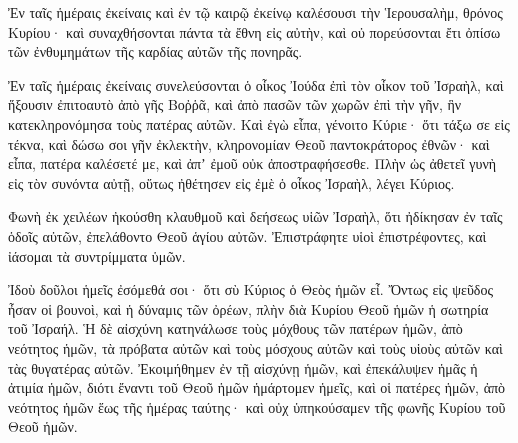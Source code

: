 {Ἐν ταῖς ἡμέραις ἐκείναις καὶ ἐν τῷ καιρῷ ἐκείνῳ καλέσουσι τὴν Ἱερουσαλὴμ, θρόνος Κυρίου· καὶ συναχθήσονται πάντα τὰ ἔθνη εἰς αὐτὴν, καὶ οὐ πορεύσονται ἔτι ὀπίσω τῶν ἐνθυμημάτων τῆς καρδίας αὐτῶν τῆς πονηρᾶς.
\par }{\PP {}Ἐν ταῖς ἡμέραις ἐκείναις συνελεύσονται ὁ οἶκος Ἰούδα ἐπὶ τὸν οἶκον τοῦ Ἰσραὴλ, καὶ ἥξουσιν ἐπιτοαυτὸ ἀπὸ γῆς Βοῤῥᾶ, καὶ ἀπὸ πασῶν τῶν χωρῶν ἐπὶ τὴν γῆν, ἣν κατεκληρονόμησα τοὺς πατέρας αὐτῶν.
Καὶ ἐγὼ εἶπα, γένοιτο Κύριε· ὅτι τάξω σε εἰς τέκνα, καὶ δώσω σοι γῆν ἐκλεκτὴν, κληρονομίαν Θεοῦ παντοκράτορος ἐθνῶν· καὶ εἶπα, πατέρα καλέσετέ με, καὶ ἀπʼ ἐμοῦ οὐκ ἀποστραφήσεσθε.
Πλὴν ὡς ἀθετεῖ γυνὴ εἰς τὸν συνόντα αὐτῇ, οὕτως ἠθέτησεν εἰς ἐμὲ ὁ οἶκος Ἰσραὴλ, λέγει Κύριος.
\par }{\PP {}Φωνὴ ἐκ χειλέων ἠκούσθη κλαυθμοῦ καὶ δεήσεως υἱῶν Ἰσραὴλ, ὅτι ἠδίκησαν ἐν ταῖς ὁδοῖς αὐτῶν, ἐπελάθοντο Θεοῦ ἁγίου αὐτῶν.
Ἐπιστράφητε υἱοὶ ἐπιστρέφοντες, καὶ ἰάσομαι τὰ συντρίμματα ὑμῶν.
\par }{\PP Ἰδοὺ δοῦλοι ἡμεῖς ἐσόμεθά σοι· ὅτι σὺ Κύριος ὁ Θεὸς ἡμῶν εἶ.
Ὄντως εἰς ψεῦδος ἦσαν οἱ βουνοὶ, καὶ ἡ δύναμις τῶν ὀρέων, πλὴν διὰ Κυρίου Θεοῦ ἡμῶν ἡ σωτηρία τοῦ Ἰσραήλ.
Ἡ δὲ αἰσχύνη κατηνάλωσε τοὺς μόχθους τῶν πατέρων ἡμῶν, ἀπὸ νεότητος ἡμῶν, τὰ πρόβατα αὐτῶν καὶ τοὺς μόσχους αὐτῶν καὶ τοὺς υἱοὺς αὐτῶν καὶ τὰς θυγατέρας αὐτῶν.
Ἐκοιμήθημεν ἐν τῇ αἰσχύνῃ ἡμῶν, καὶ ἐπεκάλυψεν ἡμᾶς ἡ ἀτιμία ἡμῶν, διότι ἔναντι τοῦ Θεοῦ ἡμῶν ἡμάρτομεν ἡμεῖς, καὶ οἱ πατέρες ἡμῶν, ἀπὸ νεότητος ἡμῶν ἕως τῆς ἡμέρας ταύτης· καὶ οὐχ ὑπηκούσαμεν τῆς φωνῆς Κυρίου τοῦ Θεοῦ ἡμῶν.

}
